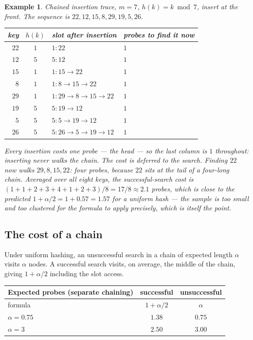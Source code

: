 \documentclass[11pt]{article}
\newtheorem{example}{Example}[section]
\begin{document}
\begin{example}
\emph{Chained insertion trace, $m = 7$, $h(k) = k \bmod 7$, insert at the front.} The sequence is $22, 12, 15, 8, 29, 19, 5, 26$.

\begin{center}
{\scriptsize
\begin{tabular}{rcll}
  \toprule
  key & $h(k)$ & slot after insertion & probes to find it now \\
  \midrule
  $22$ & $1$ & $1: 22$ & $1$ \\
  $12$ & $5$ & $5: 12$ & $1$ \\
  $15$ & $1$ & $1: 15 \to 22$ & $1$ \\
  $8$  & $1$ & $1: 8 \to 15 \to 22$ & $1$ \\
  $29$ & $1$ & $1: 29 \to 8 \to 15 \to 22$ & $1$ \\
  $19$ & $5$ & $5: 19 \to 12$ & $1$ \\
  $5$  & $5$ & $5: 5 \to 19 \to 12$ & $1$ \\
  $26$ & $5$ & $5: 26 \to 5 \to 19 \to 12$ & $1$ \\
  \bottomrule
\end{tabular}}
\end{center}

Every insertion costs one probe --- the head --- so the last column is $1$ throughout: inserting never walks the chain. The cost is deferred to the search. Finding $22$ now walks $29, 8, 15, 22$: four probes, because $22$ sits at the tail of a four-long chain. Averaged over all eight keys, the successful-search cost is $(1+1+2+3+4+1+2+3)/8 = 17/8 \approx 2.1$ probes, which is close to the predicted $1 + \alpha/2 = 1 + 0.57 = 1.57$ for a uniform hash --- the sample is too small and too clustered for the formula to apply precisely, which is itself the point.
\end{example}

\subsection{The cost of a chain}

Under uniform hashing, an unsuccessful search in a chain of expected length $\alpha$ visits $\alpha$ nodes. A successful search visits, on average, the middle of the chain, giving $1 + \alpha/2$ including the slot access.

\begin{center}
{\footnotesize
\begin{tabular}{lcc}
  \toprule
  Expected probes (separate chaining) & successful & unsuccessful \\
  \midrule
  formula & $1 + \alpha/2$ & $\alpha$ \\
  $\alpha = 0.75$ & $1.38$ & $0.75$ \\
  $\alpha = 3$ & $2.50$ & $3.00$ \\
  \bottomrule
\end{tabular}}
\end{center}
\end{document}

